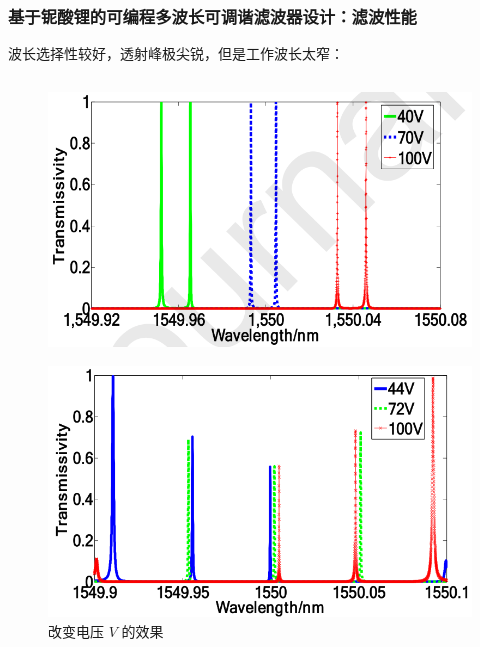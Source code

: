 \begin{frame}[c]
    \frametitle{基于铌酸锂的可编程多波长可调谐滤波器设计：滤波性能}

    波长选择性较好，透射峰极尖锐，但是工作波长太窄：

    \begin{columns}
        \begin{column}{0.5\textwidth}
            \begin{figure}[H] %
                \centering %
                \includegraphics[width=.9\textwidth]{figures/Design of programmable multi-wavelength tunable filter on lithium niobate_2.png} %
            \end{figure}
            \begin{figure}[H] %
                \centering %
                \includegraphics[width=.9\textwidth]{figures/Design of programmable multi-wavelength tunable filter on lithium niobate_3.png} %
                \caption{改变电压 $V$ 的效果}
            \end{figure}

\end{column}
\end{columns}
\end{frame}
